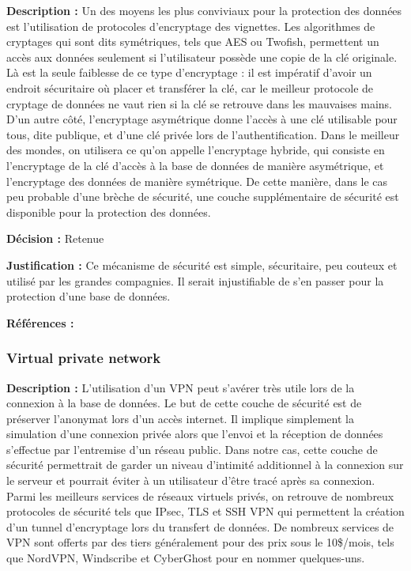 \textbf{Description :} Un des moyens les plus conviviaux pour la protection des données est l’utilisation de protocoles d’encryptage des vignettes. Les algorithmes de cryptages qui sont dits symétriques, tels que AES ou Twofish, permettent un accès aux données seulement si l’utilisateur possède une copie de la clé originale. Là est la seule faiblesse de ce type d’encryptage : il est impératif d’avoir un endroit sécuritaire où placer et transférer la clé, car le meilleur protocole de cryptage de données ne vaut rien si la clé se retrouve dans les mauvaises mains. D’un autre côté, l’encryptage asymétrique donne l’accès à une clé utilisable pour tous, dite publique, et d’une clé privée lors de l’authentification. Dans le meilleur des mondes, on utilisera ce qu’on appelle l’encryptage hybride, qui consiste en l’encryptage de la clé d’accès à la base de données de manière asymétrique, et l’encryptage des données de manière symétrique. De cette manière, dans le cas peu probable d’une brèche de sécurité, une couche supplémentaire de sécurité est disponible pour la protection des données.

\textbf{Décision :}  Retenue

\textbf{Justification :}  Ce mécanisme de sécurité est simple, sécuritaire, peu couteux et utilisé par les grandes compagnies. Il serait injustifiable de s’en passer pour la protection d’une base de données.

\textbf{Références :} 

\subsubsection{Virtual private network}

\textbf{Description :} L’utilisation d’un VPN peut s’avérer très utile lors de la connexion à la base de données. Le but de cette couche de sécurité est de préserver l’anonymat lors d’un accès internet. Il implique simplement la simulation d’une connexion privée alors que l’envoi et la réception de données s’effectue par l’entremise d’un réseau public. Dans notre cas, cette couche de sécurité permettrait de garder un niveau d’intimité additionnel à la connexion sur le serveur et pourrait éviter à un utilisateur d’être tracé après sa connexion. Parmi les meilleurs services de réseaux virtuels privés, on retrouve de nombreux protocoles de sécurité tels que IPsec, TLS et SSH VPN qui permettent la création d’un tunnel d’encryptage lors du transfert de données. De nombreux services de VPN sont offerts par des tiers généralement pour des prix sous le 10\$/mois, tels que NordVPN, Windscribe et CyberGhost pour en nommer quelques-uns.

